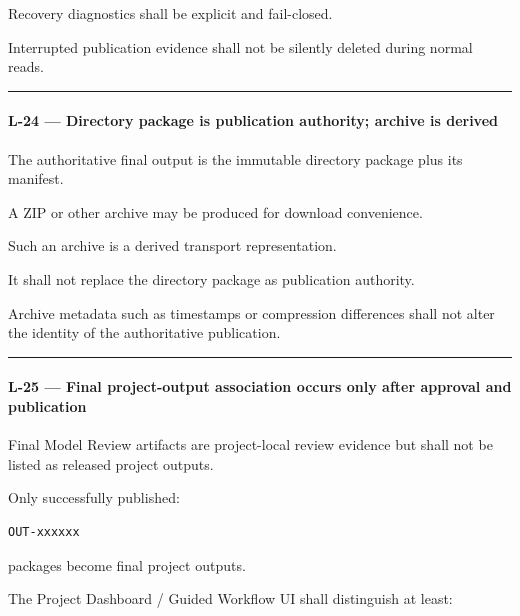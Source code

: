 Recovery diagnostics shall be explicit and fail-closed.

Interrupted publication evidence shall not be silently deleted during normal reads.

\begin{center}\rule{0.5\linewidth}{0.5pt}\end{center}

\hypertarget{l-24--directory-package-is-publication-authority-archive-is-derived}{%
\paragraph{L-24 --- Directory package is publication authority; archive is derived}\label{l-24--directory-package-is-publication-authority-archive-is-derived}}

The authoritative final output is the immutable directory package plus its manifest.

A ZIP or other archive may be produced for download convenience.

Such an archive is a derived transport representation.

It shall not replace the directory package as publication authority.

Archive metadata such as timestamps or compression differences shall not alter the identity of the authoritative publication.

\begin{center}\rule{0.5\linewidth}{0.5pt}\end{center}

\hypertarget{l-25--final-project-output-association-occurs-only-after-approval-and-publication}{%
\paragraph{L-25 --- Final project-output association occurs only after approval and publication}\label{l-25--final-project-output-association-occurs-only-after-approval-and-publication}}

Final Model Review artifacts are project-local review evidence but shall not be listed as released project outputs.

Only successfully published:

\begin{verbatim}
OUT-xxxxxx
\end{verbatim}

packages become final project outputs.

The Project Dashboard / Guided Workflow UI shall distinguish at least:

